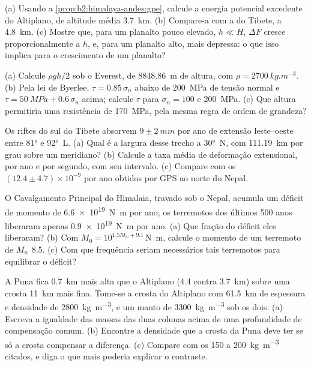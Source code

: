\begin{exercise}[$\star\star$]\label{exo:b2:himalaya-andes:6}
(a) Usando a \cref{prop:b2:himalaya-andes:gpe}, calcule a energia potencial excedente do
Altiplano, de altitude média \qty{3.7}{km}. (b) Compare-a com a do Tibete, a \qty{4.8}{km}.
(c) Mostre que, para um planalto pouco elevado, $h \ll H$, $\Delta F$ cresce proporcionalmente a $h$, e, para um
planalto alto, mais depressa: o que isso implica para o crescimento de um planalto?
\end{exercise}

\begin{exercise}[$\star\star$]\label{exo:b2:himalaya-andes:7}
(a) Calcule $\rho g h/2$ sob o Everest, de \qty{8848.86}{m} de altura, com $\rho =
\qty{2700}{kg.m^{-3}}$. (b) Pela lei de Byerlee, $\tau = 0.85\,\sigma_n$ abaixo de \qty{200}{MPa} de
tensão normal e $\tau = \qty{50}{MPa} + 0.6\,\sigma_n$ acima; calcule $\tau$ para $\sigma_n =
100$ e \qty{200}{MPa}. (c) Que altura permitiria uma resistência de \qty{170}{MPa}, pela mesma
regra de ordem de grandeza?
\end{exercise}

\begin{exercise}[$\star\star$]\label{exo:b2:himalaya-andes:8}
Os riftes do sul do Tibete absorvem $9 \pm \qty{2}{mm}$ por ano de extensão leste--oeste entre
\ang{81} e \ang{92}~L. (a) Qual é a largura desse trecho a \ang{30}~N, com \qty{111.19}{km} por
grau sobre um meridiano? (b) Calcule a taxa média de deformação extensional, por ano e por segundo,
com seu intervalo. (c) Compare com os $(12.4 \pm 4.7) \times 10^{-9}$ por ano obtidos por GPS ao norte do Nepal.
\end{exercise}

\begin{exercise}[$\star\star$]\label{exo:b2:himalaya-andes:9}
O Cavalgamento Principal do Himalaia, travado sob o Nepal, acumula um déficit de momento de
\qty{6.6e19}{N.m} por ano; os terremotos dos últimos 500 anos liberaram apenas
\qty{0.9e19}{N.m} por ano. (a) Que fração do déficit eles liberaram? (b) Com $M_0 =
10^{1.5 M_w + 9.1}$\,\unit{N.m}, calcule o momento de um terremoto de $M_w$ 8.5. (c) Com que frequência
seriam necessários tais terremotos para equilibrar o déficit?
\end{exercise}

\begin{exercise}[$\star\star\star$]\label{exo:b2:himalaya-andes:10}
A Puna fica \qty{0.7}{km} mais alta que o Altiplano (4.4 contra \qty{3.7}{km}) sobre uma crosta
\qty{11}{km} mais fina. Tome-se a crosta do Altiplano com \qty{61.5}{km} de espessura e densidade de
\qty{2800}{kg.m^{-3}}, e um manto de \qty{3300}{kg.m^{-3}} sob os dois. (a) Escreva a
igualdade das massas das duas colunas acima de uma profundidade de compensação comum. (b) Encontre a
densidade que a crosta da Puna deve ter se só a crosta compensar a diferença. (c) Compare
com os 150 a \qty{200}{kg.m^{-3}} citados, e diga o que mais poderia explicar o contraste.
\end{exercise}

